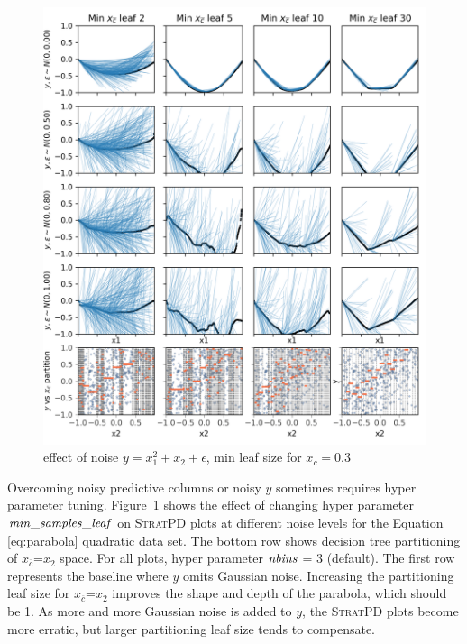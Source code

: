 \documentclass[12pt]{article}
\newcommand{\figref}[1]{Figure~\ref{#1}}
\newcommand{\spd}{\fontfamily{cmr}\textsc{\small StratPD}}
\newcommand{\xnc}{$x_{\overline{c}}$}
\begin{document}
\begin{figure}[htbp]
\begin{center}
\includegraphics[scale=0.7]{images/meta_additivity_noise.png}
\caption{effect of noise $y = x_1^2 + x_2 + \epsilon$, min leaf size for $x_c=0.3$}
\label{fig:meta_noise}
\end{center}
\end{figure}

Overcoming noisy predictive columns or noisy $y$ sometimes requires hyper parameter tuning. \figref{fig:meta_noise} shows the effect of changing hyper parameter ${\it min\_samples\_leaf}$ on \spd{} plots at different noise levels for the Equation \eqref{eq:parabola} quadratic data set. The bottom row shows decision tree partitioning of \xnc{}=$x_2$ space. For all plots, hyper parameter ${\it nbins}$ = 3 (default). The first row represents the baseline where $y$ omits Gaussian noise.  Increasing the partitioning leaf size for \xnc{}=$x_2$ improves the shape and depth of the parabola, which should be 1.  As more and more Gaussian noise is added to $y$, the \spd{} plots become more erratic, but larger partitioning leaf size tends to compensate.
\end{document}
